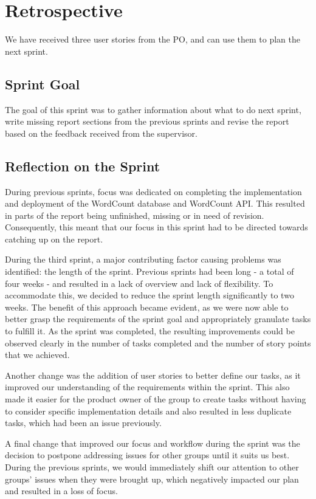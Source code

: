 \section{Retrospective}
We have received three user stories from the PO, and can use them to plan the next sprint.

\subsection{Sprint Goal}
The goal of this sprint was to gather information about what to do next sprint, write missing report sections from the previous sprints and revise the report based on the feedback received from the supervisor. 

\subsection{Reflection on the Sprint}
During previous sprints, focus was dedicated on completing the implementation and deployment of the WordCount database and WordCount API. This resulted in parts of the report being unfinished, missing or in need of revision. Consequently, this meant that our focus in this sprint had to be directed towards catching up on the report.


During the third sprint, a major contributing factor causing problems was identified: the length of the sprint. Previous sprints had been long - a total of four weeks - and resulted in a lack of overview and lack of flexibility. To accommodate this, we decided to reduce the sprint length significantly to two weeks. The benefit of this approach became evident, as we were now able to better grasp the requirements of the sprint goal and appropriately granulate tasks to fulfill it. As the sprint was completed, the resulting improvements could be observed clearly in the number of tasks completed and the number of story points that we achieved. 


Another change was the addition of user stories to better define our tasks, as it improved our understanding of the requirements within the sprint. This also made it easier for the product owner of the group to create tasks without having to consider specific implementation details and also resulted in less duplicate tasks, which had been an issue previously.


A final change that improved our focus and workflow during the sprint was the decision to postpone addressing issues for other groups until it suits us best. During the previous sprints, we would immediately shift our attention to other groups' issues when they were brought up, which negatively impacted our plan and resulted in a loss of focus.

